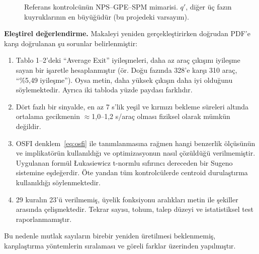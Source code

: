 \documentclass[11pt,a4paper]{article}
\theoremstyle{definition}
\begin{document}
\begin{figure}[t]
\centering
{}
\caption{Referans kontrolcünün NPS--GPE--SPM mimarisi. $q'$, diğer üç fazın kuyruklarının en büyüğüdür (bu projedeki varsayım).}
\label{fig:arch}
\end{figure}

\textbf{Eleştirel değerlendirme.} Makaleyi yeniden gerçekleştirirken doğrudan PDF'e karşı doğrulanan şu sorunlar belirlenmiştir:
\begin{enumerate}[label=(\alph*)]
\item Tablo 1--2'deki ``Average Exit'' iyileşmeleri, daha az araç çıkışını iyileşme sayan bir işaretle hesaplanmıştır (ör. Doğu fazında 328'e karşı 310 araç, ``\%5,49 iyileşme''). Oysa metin, daha yüksek çıkışın daha iyi olduğunu söylemektedir. Ayrıca iki tabloda yüzde paydası farklıdır.
\item Dört fazlı bir sinyalde, en az 7 s'lik yeşil ve kırmızı bekleme süreleri altında ortalama gecikmenin $\approx$1,0--1,2 s/araç olması fiziksel olarak mümkün değildir.
\item OSFI denklem~\eqref{eq:osfi} ile tanımlanmasına rağmen hangi benzerlik ölçüsünün ve implikatörün kullanıldığı ve optimizasyonun nasıl çözüldüğü verilmemiştir. Uygulanan formül Łukasiewicz t-normlu sıfırıncı dereceden bir Sugeno sistemine eşdeğerdir. Öte yandan tüm kontrolcülerde centroid durulaştırma kullanıldığı söylenmektedir.
\item 29 kuralın 23'ü verilmemiş, üyelik fonksiyonu aralıkları metin ile şekiller arasında çelişmektedir. Tekrar sayısı, tohum, talep düzeyi ve istatistiksel test raporlanmamıştır.
\end{enumerate}
Bu nedenle mutlak sayıların birebir yeniden üretilmesi beklenmemiş, karşılaştırma yöntemlerin sıralaması ve göreli farklar üzerinden yapılmıştır.
\end{document}
